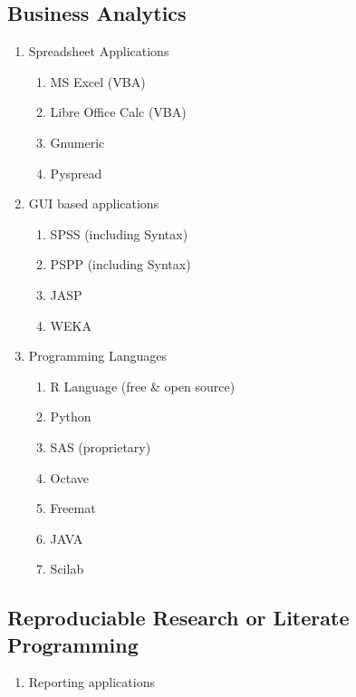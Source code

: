 \documentclass[10pt]{article}
\begin{document}
\begin{multicols}{2} 
\subsection{Business Analytics} 

\begin{enumerate} 

\item Spreadsheet Applications 

\begin{enumerate} 
\item MS Excel (VBA) 
\item Libre Office Calc (VBA) 
\item Gnumeric
\item Pyspread
\end{enumerate} 

\item GUI based applications 

\begin{enumerate} 
\item SPSS (including Syntax)	
\item PSPP (including Syntax) 
\item JASP 
\item WEKA 
\end{enumerate} 

\item Programming Languages

\begin{enumerate} 
\item R Language (free \& open source) 
\item Python 
\item SAS (proprietary) 
\item Octave 
\item Freemat 
\item JAVA
\item Scilab
\end{enumerate} 

\end{enumerate}

\subsection{Reproduciable Research or Literate Programming}
\begin{enumerate}

\item Reporting applications


\end{enumerate}
\end{multicols}
\end{document}
